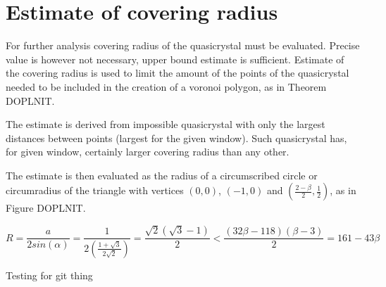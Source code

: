 \documentclass[text.tex]{subfiles}
\begin{document}
\section{Estimate of covering radius}

For further analysis covering radius of the quasicrystal must be evaluated. 
Precise value is however not necessary, upper bound estimate is sufficient. 
Estimate of the covering radius is used to limit the amount of the points of the quasicrystal needed to be included in the creation of a voronoi polygon, as in Theorem DOPLNIT. 

The estimate is derived from impossible quasicrystal with only the largest distances between points (largest for the given window). Such quasicrystal has, for given window, certainly larger covering radius than any other. 

The estimate is then evaluated as the radius of a circumscribed circle or circumradius of the triangle with vertices $(0,0)$, $(-1,0)$ and $\left(\frac{2-\beta}{2},\frac{1}{2}\right)$, as in Figure DOPLNIT. 

$$R = \frac{a}{2sin(\alpha)} = \frac{1}{2\left(\frac{1+\sqrt{3}}{2\sqrt{2}}\right)} = \frac{\sqrt{2}(\sqrt{3}-1)}{2} < \frac{(32\beta-118)(\beta-3)}{2} = 161-43\beta$$

Testing for git thing 
\end{document}

